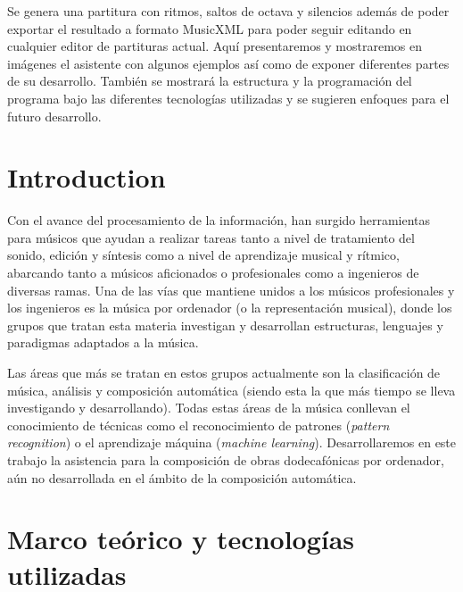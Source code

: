 \documentclass[a4paper,openany,oneside,12pt]{book}
\begin{document}
Se genera una partitura con ritmos, saltos de octava y silencios además de poder exportar el resultado a formato MusicXML para poder seguir editando en cualquier editor de partituras actual. Aquí presentaremos y mostraremos en imágenes el asistente con algunos ejemplos así como de exponer diferentes partes de su desarrollo. También se mostrará la estructura y la programación del programa bajo las diferentes tecnologías utilizadas y se sugieren enfoques para el futuro desarrollo.



\newpage


\tableofcontents %

\cleardoublepage
{} %
\listoffigures %





\chapter{Introduction}
Con el avance del procesamiento de la información, han surgido herramientas para músicos que ayudan a realizar tareas tanto a nivel de tratamiento del sonido, edición y síntesis como a nivel de aprendizaje musical y rítmico, abarcando tanto a músicos aficionados o profesionales como a ingenieros de diversas ramas. Una de las vías que mantiene unidos a los músicos profesionales y los ingenieros es la música por ordenador (o la representación musical), donde los grupos que tratan esta materia investigan y desarrollan estructuras, lenguajes y paradigmas adaptados a la música.

Las áreas que más se tratan en estos grupos actualmente son la clasificación de música, análisis y composición automática (siendo esta la que más tiempo se lleva investigando y desarrollando). Todas estas áreas de la música conllevan el conocimiento de técnicas como el reconocimiento de patrones (\emph{pattern recognition}) o el aprendizaje máquina (\emph{machine learning}). Desarrollaremos en este trabajo la asistencia para la composición de obras dodecafónicas por ordenador, aún no desarrollada en el ámbito de la composición automática.

\chapter{Marco teórico y tecnologías utilizadas}\label{marcoteorico}
\end{document}
